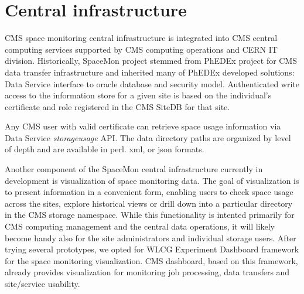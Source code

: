 \section {Central infrastructure}

CMS space monitoring central infrastructure is integrated into CMS central computing services 
supported by CMS computing operations and CERN IT division.
Historically, SpaceMon project stemmed from PhEDEx project for CMS data transfer infrastructure
\cite{phedex} and inherited many of PhEDEx developed solutions: Data Service interface to oracle database
\cite{dataservice} and security model. Authenticated write access to the information store for a given site 
is based on the individual's certificate and role registered in the CMS SiteDB \cite{sitedb} for that site.

Any CMS user with valid certificate can retrieve space usage information via Data Service 
{\it storageusage} API. The data directory paths are organized by level of depth and are available in 
perl. xml, or json formats. 

Another component of the SpaceMon central infrastructure currently in development is 
visualization of space monitoring data.  The goal of visualization is to present information 
in a convenient form, enabling users to check space usage across the sites, 
explore historical views or drill down into a particular directory in the   
CMS storage namespace. 
While this functionality is intented primarily for CMS computing management and the central data 
operations, it will likely become handy also for the site administrators and individual storage users.
After trying several prototypes, we opted for WLCG Experiment Dashboard \cite{ExpDashboard} 
framework for the space monitoring visualization. CMS dashboard, based on this 
framework, already provides visualization for monitoring job processing, data 
transfers and site/service usability.


